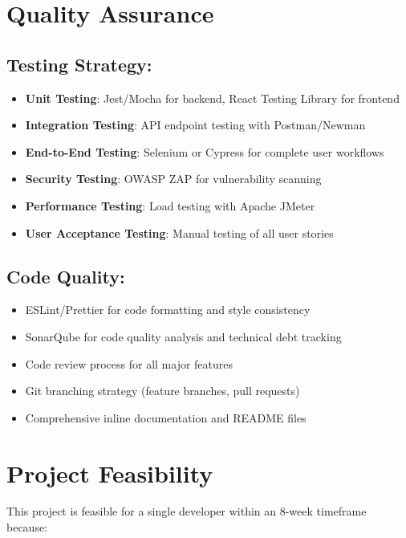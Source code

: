 \documentclass[11pt,a4paper]{article}
\begin{document}
\section{Quality Assurance}

\subsection*{Testing Strategy:}
\begin{itemize}[leftmargin=*, itemsep=0.1em]
    \item \textbf{Unit Testing}: Jest/Mocha for backend, React Testing Library for frontend
    \item \textbf{Integration Testing}: API endpoint testing with Postman/Newman
    \item \textbf{End-to-End Testing}: Selenium or Cypress for complete user workflows
    \item \textbf{Security Testing}: OWASP ZAP for vulnerability scanning
    \item \textbf{Performance Testing}: Load testing with Apache JMeter
    \item \textbf{User Acceptance Testing}: Manual testing of all user stories
\end{itemize}

\subsection*{Code Quality:}
\begin{itemize}[leftmargin=*, itemsep=0.1em]
    \item ESLint/Prettier for code formatting and style consistency
    \item SonarQube for code quality analysis and technical debt tracking
    \item Code review process for all major features
    \item Git branching strategy (feature branches, pull requests)
    \item Comprehensive inline documentation and README files
\end{itemize}

\section{Project Feasibility}

This project is feasible for a single developer within an 8-week timeframe because:
\end{document}
